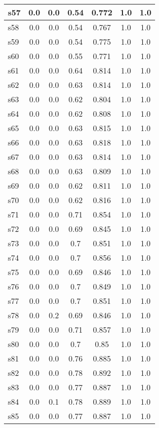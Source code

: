 \documentclass{article}
\begin{document}
\begin{tabular}{|l|c|c|c|c|c|c|}
\hline
s57 &0.0 & 0.0 & 0.54 & 0.772 & 1.0 & 1.0\\
\hline
s58 &0.0 & 0.0 & 0.54 & 0.767 & 1.0 & 1.0\\
\hline
s59 &0.0 & 0.0 & 0.54 & 0.775 & 1.0 & 1.0\\
\hline
s60 &0.0 & 0.0 & 0.55 & 0.771 & 1.0 & 1.0\\
\hline
s61 &0.0 & 0.0 & 0.64 & 0.814 & 1.0 & 1.0\\
\hline
s62 &0.0 & 0.0 & 0.63 & 0.814 & 1.0 & 1.0\\
\hline
s63 &0.0 & 0.0 & 0.62 & 0.804 & 1.0 & 1.0\\
\hline
s64 &0.0 & 0.0 & 0.62 & 0.808 & 1.0 & 1.0\\
\hline
s65 &0.0 & 0.0 & 0.63 & 0.815 & 1.0 & 1.0\\
\hline
s66 &0.0 & 0.0 & 0.63 & 0.818 & 1.0 & 1.0\\
\hline
s67 &0.0 & 0.0 & 0.63 & 0.814 & 1.0 & 1.0\\
\hline
s68 &0.0 & 0.0 & 0.63 & 0.809 & 1.0 & 1.0\\
\hline
s69 &0.0 & 0.0 & 0.62 & 0.811 & 1.0 & 1.0\\
\hline
s70 &0.0 & 0.0 & 0.62 & 0.816 & 1.0 & 1.0\\
\hline
s71 &0.0 & 0.0 & 0.71 & 0.854 & 1.0 & 1.0\\
\hline
s72 &0.0 & 0.0 & 0.69 & 0.845 & 1.0 & 1.0\\
\hline
s73 &0.0 & 0.0 & 0.7 & 0.851 & 1.0 & 1.0\\
\hline
s74 &0.0 & 0.0 & 0.7 & 0.856 & 1.0 & 1.0\\
\hline
s75 &0.0 & 0.0 & 0.69 & 0.846 & 1.0 & 1.0\\
\hline
s76 &0.0 & 0.0 & 0.7 & 0.849 & 1.0 & 1.0\\
\hline
s77 &0.0 & 0.0 & 0.7 & 0.851 & 1.0 & 1.0\\
\hline
s78 &0.0 & 0.2 & 0.69 & 0.846 & 1.0 & 1.0\\
\hline
s79 &0.0 & 0.0 & 0.71 & 0.857 & 1.0 & 1.0\\
\hline
s80 &0.0 & 0.0 & 0.7 & 0.85 & 1.0 & 1.0\\
\hline
s81 &0.0 & 0.0 & 0.76 & 0.885 & 1.0 & 1.0\\
\hline
s82 &0.0 & 0.0 & 0.78 & 0.892 & 1.0 & 1.0\\
\hline
s83 &0.0 & 0.0 & 0.77 & 0.887 & 1.0 & 1.0\\
\hline
s84 &0.0 & 0.1 & 0.78 & 0.889 & 1.0 & 1.0\\
\hline
s85 &0.0 & 0.0 & 0.77 & 0.887 & 1.0 & 1.0\\

\end{tabular}
\end{document}
